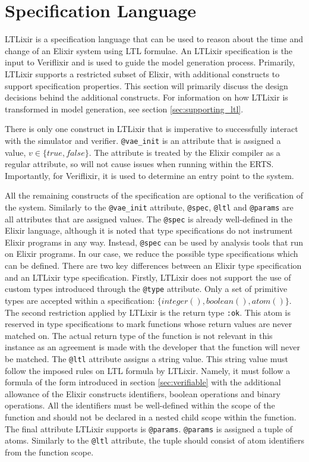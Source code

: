 \section{Specification Language} \label{sec:specification_language}
LTLixir is a specification language that can be used to reason about the time and change of an Elixir system using LTL formulae. An LTLixir specification is the input to Veriflixir and is used to guide the model generation process. Primarily, LTLixir supports a restricted subset of Elixir, with additional constructs to support specification properties. This section will primarily discuss the design decisions behind the additional constructs. For information on how LTLixir is transformed in model generation, see section \ref{sec:supporting_ltl}.
\par
There is only one construct in LTLixir that is imperative to successfully interact with the simulator and verifier. \texttt{@vae\_init} is an attribute that is assigned a value, $v \in \{true, false\}$. The attribute is treated by the Elixir compiler as a regular attribute, so will not cause issues when running within the ERTS. Importantly, for Veriflixir, it is used to determine an entry point to the system.
\par
All the remaining constructs of the specification are optional to the verification of the system. Similarly to the \texttt{@vae\_init} attribute, \texttt{@spec}, \texttt{@ltl} and \texttt{@params} are all attributes that are assigned values. The \texttt{@spec} is already well-defined in the Elixir language, although it is noted that type specifications do not instrument Elixir programs in any way. Instead, \texttt{@spec} can be used by analysis tools that run on Elixir programs. In our case, we reduce the possible type specifications which can be defined. There are two key differences between an Elixir type specification and an LTLixir type specification. Firstly, LTLixir does not support the use of custom types introduced through the \texttt{@type} attribute. Only a set of primitive types are accepted within a specification: $\{integer(), boolean(), atom()\}$. The second restriction applied by LTLixir is the return type \texttt{:ok}. This atom is reserved in type specifications to mark functions whose return values are never matched on. The actual return type of the function is not relevant in this instance as an agreement is made with the developer that the function will never be matched. The \texttt{@ltl} attribute assigns a string value. This string value must follow the imposed rules on LTL formula by LTLixir. Namely, it must follow a formula of the form introduced in section \ref{sec:verifiable} with the additional allowance of the Elixir constructs identifiers, boolean operations and binary operations. All the identifiers must be well-defined within the scope of the function and should not be declared in a nested child scope within the function. The final attribute LTLixir supports is \texttt{@params}. \texttt{@params} is assigned a tuple of atoms. Similarly to the \texttt{@ltl} attribute, the tuple should consist of atom identifiers from the function scope.
